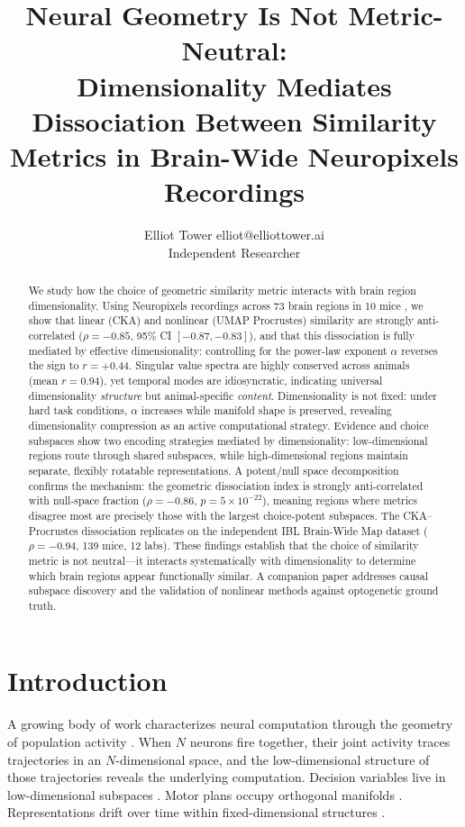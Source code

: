 \documentclass{article}
\title{Neural Geometry Is Not Metric-Neutral: \\
Dimensionality Mediates Dissociation Between Similarity Metrics in Brain-Wide Neuropixels Recordings}
\author{\name Elliot Tower \email elliot@elliottower.ai \\
      \addr Independent Researcher}
\begin{document}
\maketitle

\begin{abstract}
We study how the choice of geometric similarity metric interacts with brain region dimensionality. Using Neuropixels recordings across 73 brain regions in 10 mice \citep{steinmetz2019distributed}, we show that linear (CKA) and nonlinear (UMAP Procrustes) similarity are strongly anti-correlated ($\rho = -0.85$, 95\% CI $[-0.87, -0.83]$), and that this dissociation is fully mediated by effective dimensionality: controlling for the power-law exponent $\alpha$ reverses the sign to $r = +0.44$. Singular value spectra are highly conserved across animals (mean $r = 0.94$), yet temporal modes are idiosyncratic, indicating universal dimensionality \emph{structure} but animal-specific \emph{content}. Dimensionality is not fixed: under hard task conditions, $\alpha$ increases while manifold shape is preserved, revealing dimensionality compression as an active computational strategy. Evidence and choice subspaces show two encoding strategies mediated by dimensionality: low-dimensional regions route through shared subspaces, while high-dimensional regions maintain separate, flexibly rotatable representations. A potent/null space decomposition confirms the mechanism: the geometric dissociation index is strongly anti-correlated with null-space fraction ($\rho = -0.86$, $p = 5 \times 10^{-22}$), meaning regions where metrics disagree most are precisely those with the largest choice-potent subspaces. The CKA--Procrustes dissociation replicates on the independent IBL Brain-Wide Map dataset ($\rho = -0.94$, 139 mice, 12 labs). These findings establish that the choice of similarity metric is not neutral---it interacts systematically with dimensionality to determine which brain regions appear functionally similar. A companion paper addresses causal subspace discovery and the validation of nonlinear methods against optogenetic ground truth.
\end{abstract}

\section{Introduction}

A growing body of work characterizes neural computation through the geometry of population activity \citep{cunningham2014dimensionality, gallego2017neural}. When $N$ neurons fire together, their joint activity traces trajectories in an $N$-dimensional space, and the low-dimensional structure of those trajectories reveals the underlying computation. Decision variables live in low-dimensional subspaces \citep{steinmetz2019distributed}. Motor plans occupy orthogonal manifolds \citep{gallego2017neural}. Representations drift over time within fixed-dimensional structures \citep{driscoll2022representational}.
\end{document}
